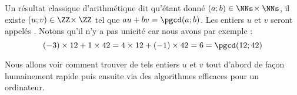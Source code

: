Un résultat classique d'arithmétique dit qu'étant donné $(a ; b) \in \NNs \!\times \NNs$, il existe $(u ; v) \in \ZZ \!\times \ZZ$ tel que $au + bv = \pgcd(a ; b)$. Les entiers $u$ et $v$ seront appelés .
Notons qu'il n'y a pas unicité car nous avons par exemple :
\[(-3) \times 12 + 1 \times 42 = 4 \times 12 + (-1) \times 42 = 6 = \pgcd(12 ; 42)\]

\medskip

Nous allons voir comment trouver de tels entiers $u$ et $v$ tout d'abord de façon humainement rapide puis ensuite via des algorithmes efficaces pour un ordinateur.